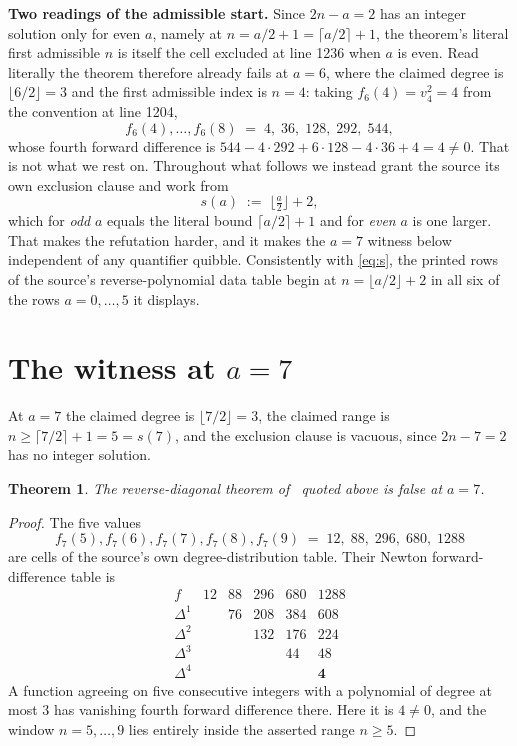 \documentclass[11pt]{amsart}
\newtheorem{theorem}{Theorem}
\theoremstyle{remark}
\begin{document}
\medskip\noindent\textbf{Two readings of the admissible start.}
Since $2n-a=2$ has an integer solution only for even $a$, namely at
$n=a/2+1=\lceil a/2\rceil+1$, the theorem's literal first admissible $n$ is
itself the cell excluded at line 1236 when $a$ is even. Read literally the
theorem therefore already fails at $a=6$, where the claimed degree is
$\lfloor6/2\rfloor=3$ and the first admissible index is $n=4$: taking
$f_6(4)=v_4^2=4$ from the convention at line 1204,
\[
 f_6(4),\dots,f_6(8)\;=\;4,\;36,\;128,\;292,\;544,
\]
whose fourth forward difference is $544-4\cdot292+6\cdot128-4\cdot36+4=4\ne0$.
That is not what we rest on. Throughout what follows we
instead grant the source its own exclusion clause and work from
\begin{equation}\label{eq:s}
  s(a)\;:=\;\Big\lfloor \tfrac a2\Big\rfloor+2,
\end{equation}
which for \emph{odd} $a$ equals the literal bound $\lceil a/2\rceil+1$ and for
\emph{even} $a$ is one larger. That makes the refutation harder, and it makes
the $a=7$ witness below independent of any quantifier quibble. Consistently
with \eqref{eq:s}, the printed rows of the source's reverse-polynomial data
table begin at
$n=\lfloor a/2\rfloor+2$ in all six of the rows $a=0,\dots,5$ it displays.

\section{The witness at \texorpdfstring{$a=7$}{a=7}}

At $a=7$ the claimed degree is $\lfloor7/2\rfloor=3$, the claimed range is
$n\ge\lceil7/2\rceil+1=5=s(7)$, and the exclusion clause is vacuous, since
$2n-7=2$ has no integer solution.

\begin{theorem}\label{thm:a7}
The reverse-diagonal theorem of~\cite{CHOPTY} quoted above is false at $a=7$.
\end{theorem}

\begin{proof}
The five values
\begin{equation}\label{eq:witness}
  f_7(5),f_7(6),f_7(7),f_7(8),f_7(9)\;=\;12,\;88,\;296,\;680,\;1288
\end{equation}
are cells of the source's own degree-distribution table. Their Newton
forward-difference table is
\[
\begin{array}{lccccc}
 f      & 12 & 88 & 296 & 680 & 1288\\
 \Delta^1&    & 76 & 208 & 384 & 608\\
 \Delta^2&    &    & 132 & 176 & 224\\
 \Delta^3&    &    &     & 44  & 48\\
 \Delta^4&    &    &     &     & \mathbf{4}
\end{array}
\]
A function agreeing on five consecutive integers with a polynomial of degree at
most $3$ has vanishing fourth forward difference there. Here it is $4\ne0$, and
the window $n=5,\dots,9$ lies entirely inside the asserted range $n\ge5$.
\end{proof}
\end{document}
